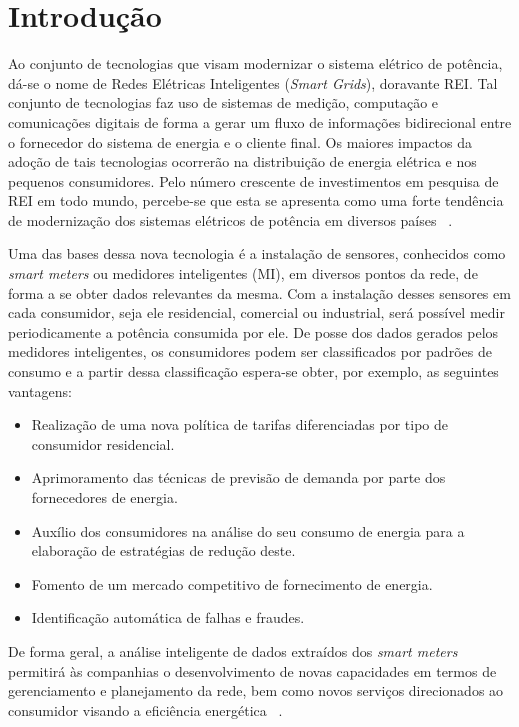 \chapter{Introdução}
Ao conjunto de tecnologias que visam modernizar o sistema elétrico de potência, dá-se o nome de Redes Elétricas Inteligentes (\emph{Smart Grids}), doravante REI. Tal conjunto de tecnologias faz uso de sistemas de medição, computação e comunicações digitais de forma a gerar um fluxo de informações bidirecional entre o fornecedor do sistema de energia e o cliente final. Os maiores impactos da adoção de tais tecnologias ocorrerão na distribuição de energia elétrica e nos pequenos consumidores. Pelo número crescente de investimentos em pesquisa de REI em todo mundo, percebe-se que esta se apresenta como uma forte tendência de modernização dos sistemas elétricos de potência em diversos países ~\parencite{REI}.

Uma das bases dessa nova tecnologia é a instalação de sensores, conhecidos como \emph{smart meters} ou medidores inteligentes (MI),  em diversos pontos da rede, de forma a se obter dados relevantes da mesma. Com a instalação desses sensores em cada consumidor, seja ele residencial, comercial ou industrial, será possível medir periodicamente a potência consumida por ele.  De posse dos dados gerados pelos medidores inteligentes, os consumidores podem ser classificados por padrões de consumo e a partir dessa classificação espera-se obter, por exemplo, as seguintes vantagens:
\begin{itemize}
	\item Realização de uma nova política de tarifas diferenciadas por tipo de consumidor residencial.
	\item Aprimoramento das técnicas de previsão de demanda por parte dos fornecedores
	de energia.
	\item Auxílio dos consumidores na análise do seu consumo de energia para a elaboração
	de estratégias de redução deste.
	\item Fomento de um mercado competitivo de fornecimento de energia.
	\item Identificação automática de falhas e fraudes.
\end{itemize}

De forma geral, a análise inteligente de dados extraídos dos \emph{smart meters} permitirá
às companhias o desenvolvimento de novas capacidades em termos de gerenciamento e
planejamento da rede, bem como novos serviços direcionados ao consumidor visando a
eficiência energética ~\parencite{ReviewElectric}.

